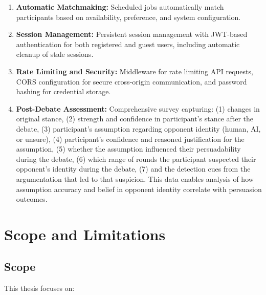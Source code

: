\begin{enumerate}
    \item \textbf{Automatic Matchmaking:} Scheduled jobs automatically match participants based
    on availability, preference, and system configuration.

    \item \textbf{Session Management:} Persistent session management with JWT-based authentication
    for both registered and guest users, including automatic cleanup of stale sessions.

    \item \textbf{Rate Limiting and Security:} Middleware for rate limiting API requests, CORS
    configuration for secure cross-origin communication, and password hashing for credential
    storage.

    \item \textbf{Post-Debate Assessment:} Comprehensive survey capturing:
    (1) changes in original stance,
    (2) strength and confidence in participant's stance after the debate,
    (3) participant's assumption regarding opponent identity (human, AI, or unsure),
    (4) participant's confidence and reasoned justification for the assumption,
    (5) whether the assumption influenced their persuadability during the debate,
    (6) which range of rounds the participant suspected their opponent's identity during the debate,
    (7) and the detection cues from the argumentation that led to that suspicion.
    This data enables analysis of how assumption accuracy and belief in opponent
    identity correlate with persuasion outcomes.
\end{enumerate}

\section{Scope and Limitations}

\subsection{Scope}

This thesis focuses on:

